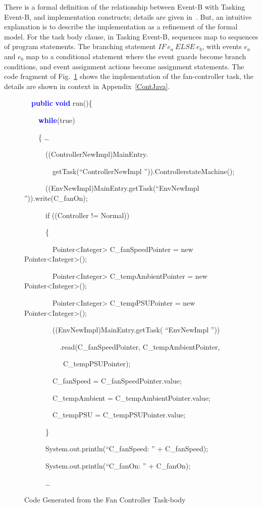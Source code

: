 \documentclass{llncs}%
\begin{document}
There is a formal definition of the relationship between Event-B with Tasking Event-B, and implementation constructs; details are given in~\cite{ae2011a}. But, an intuitive explanation is to describe the implementation as a refinement of the formal model. For the task body clause, in Tasking Event-B, sequences map to sequences of program statements. The branching statement $IF~e_a ~ELSE~e_b$, with events $e_a$ and $e_b$ map to a conditional statement where the event guards become branch conditions, and event assignment actions become assignment statements. The code fragment of Fig.~\ref{fig:FanContV} shows the implementation of the fan-controller task, the details are shown in context in Appendix~\ref{ContJava}.
%
%
%
\begin{figure}
{\ttfamily
\ \ \textbf{\textcolor{blue}{public}} \textbf{\textcolor{blue}{void}}
run()\{}

{\ttfamily
\ \ \ \ \textbf{\textcolor{blue}{while}}(true)}

{\ttfamily
\ \ \ \ \{} \ldots

{\ttfamily
\ \ \ \ \ \ ((ControllerNewImpl)MainEntry.}

{\ttfamily
\ \ \ \ \ \ \ \ getTask(``ControllerNewImpl '')).ControllerstateMachine();}

{\ttfamily
\ \ \ \ \ \ ((EnvNewImpl)MainEntry.getTask(``EnvNewImpl '')).write(C\_fanOn);}

{\ttfamily
\ \ \ \ \ \ if ((Controller != Normal))}

{\ttfamily
\ \ \ \ \ \ \{}

{\ttfamily
\ \ \ \ \ \ \ \ Pointer{\textless}Integer{\textgreater}
C\_fanSpeedPointer = new Pointer{\textless}Integer{\textgreater}();}

{\ttfamily
\ \ \ \ \ \ \ \ Pointer{\textless}Integer{\textgreater}
C\_tempAmbientPointer = new Pointer{\textless}Integer{\textgreater}();}

{\ttfamily
\ \ \ \ \ \ \ \ Pointer{\textless}Integer{\textgreater}
C\_tempPSUPointer = new Pointer{\textless}Integer{\textgreater}();}

{\ttfamily
\ \ \ \ \ \ \ \ ((EnvNewImpl)MainEntry.getTask( ``EnvNewImpl ''))}

{\ttfamily
\ \ \ \ \ \ \ \ \ \ .read(C\_fanSpeedPointer, C\_tempAmbientPointer,\

\ \ \ \ \ \ \ \ \ \ \ C\_tempPSUPointer);}

{\ttfamily
\ \ \ \ \ \ \ \ C\_fanSpeed = C\_fanSpeedPointer.value;}

{\ttfamily
\ \ \ \ \ \ \ \ C\_tempAmbient = C\_tempAmbientPointer.value;}

{\ttfamily
\ \ \ \ \ \ \ \ C\_tempPSU = C\_tempPSUPointer.value;}

{\ttfamily
\ \ \ \ \ \ \}}

{\ttfamily
\ \ \ \ \ \ System.out.println(``C\_fanSpeed: '' + C\_fanSpeed);}

{\ttfamily
\ \ \ \ \ \ System.out.println(``C\_fanOn: '' + C\_fanOn);}

{\ttfamily
\ \ \ \ \ \ {\dots} }
\caption{Code Generated from the Fan Controller Task-body}
\label{fig:FanContV}
\end{figure}
\end{document}
